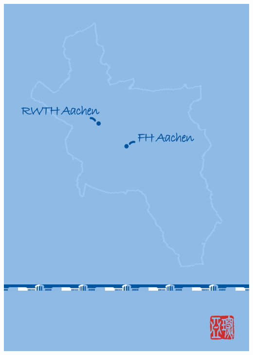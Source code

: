 \documentclass[a4paper,10pt,oneside]{scrbook}
\begin{document}
\begin{titlepage}
\parindent=0pt
\includegraphics[width=\linewidth]{Bilder/BackCover.jpg}
\end{titlepage}
\end{document}
